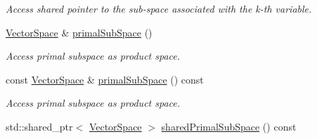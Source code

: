 \begin{DoxyCompactItemize}
\begin{DoxyCompactList}\small\item\em Access shared pointer to the sub-\/space associated with the k-\/th variable. \end{DoxyCompactList}\item 
\hyperlink{classSpacy_1_1VectorSpace}{Vector\+Space} \& \hyperlink{classSpacy_1_1ProductSpace_1_1VectorCreator_a62838fa0e7bc808c202d649aeb374e4b_a62838fa0e7bc808c202d649aeb374e4b}{primal\+Sub\+Space} ()
\begin{DoxyCompactList}\small\item\em Access primal subspace as product space. \end{DoxyCompactList}\item 
const \hyperlink{classSpacy_1_1VectorSpace}{Vector\+Space} \& \hyperlink{classSpacy_1_1ProductSpace_1_1VectorCreator_ac0730f7ac4b40e1ce7ee8d3730202664_ac0730f7ac4b40e1ce7ee8d3730202664}{primal\+Sub\+Space} () const 
\begin{DoxyCompactList}\small\item\em Access primal subspace as product space. \end{DoxyCompactList}\item 
\hypertarget{classSpacy_1_1ProductSpace_1_1VectorCreator_af2c0d26a76deb47c1549960ba726fc9a}{}std\+::shared\+\_\+ptr$<$ \hyperlink{classSpacy_1_1VectorSpace}{Vector\+Space} $>$ \hyperlink{classSpacy_1_1ProductSpace_1_1VectorCreator_af2c0d26a76deb47c1549960ba726fc9a}{shared\+Primal\+Sub\+Space} () const \label{classSpacy_1_1ProductSpace_1_1VectorCreator_af2c0d26a76deb47c1549960ba726fc9a}


\end{DoxyCompactItemize}
